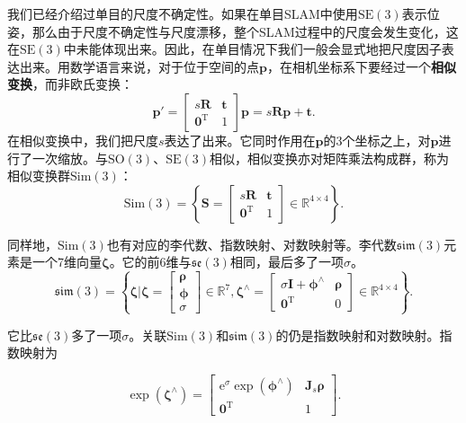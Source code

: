 我们已经介绍过单目的尺度不确定性。如果在单目SLAM中使用$\mathrm{SE}(3)$表示位姿，那么由于尺度不确定性与尺度漂移，整个SLAM过程中的尺度会发生变化，这在$\mathrm{SE}(3)$中未能体现出来。因此，在单目情况下我们一般会显式地把尺度因子表达出来。用数学语言来说，对于位于空间的点$\bm{p}$，在相机坐标系下要经过一个\textbf{相似变换}，而非欧氏变换：
\begin{equation}\label{key}
\bm{p}' = \left[ {\begin{array}{*{20}{c}}
	{s\bm{R}}&\bm{t}\\
	{{\bm{0}^\mathrm{T}}}&1
	\end{array}} \right] \bm{p}
	= s\bm{R} \bm{p} + \bm{t}.
\end{equation}
在相似变换中，我们把尺度$s$表达了出来。它同时作用在$\bm{p}$的3个坐标之上，对$\bm{p}$进行了一次缩放。与$\mathrm{SO}(3)$、$\mathrm{SE}(3)$相似，相似变换亦对矩阵乘法构成群，称为相似变换群$\mathrm{Sim}(3)$：
\begin{equation}\label{key}
\mathrm{Sim}(3) = \left\{ { \bm{S} = \left[ {\begin{array}{*{20}{c}}
		{s\bm{R}}& \bm{t}\\
		{{\bm{0}^\mathrm{T}}}&1
		\end{array}} \right] \in {\mathbb{R}^{4 \times 4}}} \right\}.
\end{equation}

同样地，$\mathrm{Sim}(3)$也有对应的李代数、指数映射、对数映射等。李代数$\mathfrak{sim}(3)$元素是一个7维向量$\bm{\zeta}$。它的前6维与$\mathfrak{se}(3)$相同，最后多了一项$\sigma$。
\begin{equation}
\mathfrak{sim} \left( 3 \right) = \left\{ { \bm{\zeta} | \bm{\zeta}  = \left[ \begin{array}{l}
	\bm{\rho} \\
	\bm{\phi} \\
	\sigma
	\end{array} \right] \in { \mathbb{R}^7},{ \bm{\zeta} ^ \wedge } = \left[ {\begin{array}{*{20}{c}}
		{\sigma \bm{I} + {\bm{\phi} ^ \wedge }}&\bm{\rho} \\
		{{\bm{0}^\mathrm{T}}}&0
		\end{array}} \right] \in {\mathbb{R}^{4 \times 4}}} \right\}.
\end{equation}

它比$\mathfrak{se}(3)$多了一项$\sigma$。关联$\mathrm{Sim}(3)$和$\mathfrak{sim}(3)$的仍是指数映射和对数映射。指数映射为

\begin{equation}
\exp \left( {{ \bm{\zeta} ^ \wedge }} \right) = \left[ {\begin{array}{*{20}{c}}
	{{\mathrm{e}^\sigma }\exp \left( {{ \bm{\phi} ^ \wedge }} \right)}&{ \bm{J}_s \bm{\rho} }\\
	{{\bm{0}^\mathrm{T}}}&1
	\end{array}} \right].
\end{equation}

